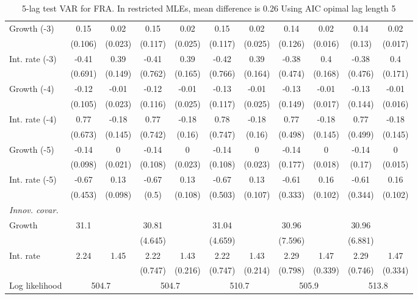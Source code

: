 \begin{table}[htbp]
\begin{tabular}{@{\extracolsep{4pt}}lcccccccccc@{}}
\quad Growth (-3) 	 &0.15 	 & 0.02 	 & 0.15 	 & 0.02 	 & 0.15 	 & 0.02 	 & 0.14 	 & 0.02 	 & 0.14 	 & 0.02	 \\ 
 		 & (0.106) 	 & (0.023) 	 & (0.117) 	 & (0.025) 	 & (0.117) 	 & (0.025) 	 & (0.126) 	 & (0.016) 	 & (0.13) 	 & (0.017) 	 \\ 
\quad Int. rate (-3) 	 &-0.41 	 & 0.39 	 & -0.41 	 & 0.39 	 & -0.42 	 & 0.39 	 & -0.38 	 & 0.4 	 & -0.38 	 & 0.4	 \\ 
 		 & (0.691) 	 & (0.149) 	 & (0.762) 	 & (0.165) 	 & (0.766) 	 & (0.164) 	 & (0.474) 	 & (0.168) 	 & (0.476) 	 & (0.171) 	 \\ 
\quad Growth (-4) 	 &-0.12 	 & -0.01 	 & -0.12 	 & -0.01 	 & -0.13 	 & -0.01 	 & -0.13 	 & -0.01 	 & -0.13 	 & -0.01	 \\ 
 		 & (0.105) 	 & (0.023) 	 & (0.116) 	 & (0.025) 	 & (0.117) 	 & (0.025) 	 & (0.149) 	 & (0.017) 	 & (0.144) 	 & (0.016) 	 \\ 
\quad Int. rate (-4) 	 &0.77 	 & -0.18 	 & 0.77 	 & -0.18 	 & 0.78 	 & -0.18 	 & 0.77 	 & -0.18 	 & 0.77 	 & -0.18	 \\ 
 		 & (0.673) 	 & (0.145) 	 & (0.742) 	 & (0.16) 	 & (0.747) 	 & (0.16) 	 & (0.498) 	 & (0.145) 	 & (0.499) 	 & (0.145) 	 \\ 
\quad Growth (-5) 	 &-0.14 	 & 0 	 & -0.14 	 & 0 	 & -0.14 	 & 0 	 & -0.14 	 & 0 	 & -0.14 	 & 0	 \\ 
 		 & (0.098) 	 & (0.021) 	 & (0.108) 	 & (0.023) 	 & (0.108) 	 & (0.023) 	 & (0.177) 	 & (0.018) 	 & (0.17) 	 & (0.015) 	 \\ 
\quad Int. rate (-5) 	 &-0.67 	 & 0.13 	 & -0.67 	 & 0.13 	 & -0.67 	 & 0.13 	 & -0.61 	 & 0.16 	 & -0.61 	 & 0.16	 \\ 
 		 & (0.453) 	 & (0.098) 	 & (0.5) 	 & (0.108) 	 & (0.503) 	 & (0.107) 	 & (0.333) 	 & (0.102) 	 & (0.344) 	 & (0.102) 	 \\ 
\rule{0pt}{4ex} \emph{Innov. covar.}  	 & 	 & 	 & 	 & 	 & 	 & 	 & 	 & 	 & 	 &\\ 
\quad Growth 	 &31.1 	 &  	 & 30.81 	 &  	 & 31.04 	 &  	 & 30.96 	 &  	 & 30.96 	 & 	 \\ 
 		 &  	 &  	 & (4.645) 	 &  	 & (4.659) 	 &  	 & (7.596) 	 &  	 & (6.881) 	 &  	 \\ 
\quad Int. rate 	 &2.24 	 & 1.45 	 & 2.22 	 & 1.43 	 & 2.22 	 & 1.43 	 & 2.29 	 & 1.47 	 & 2.29 	 & 1.47	 \\ 
 		 &  	 &  	 & (0.747) 	 & (0.216) 	 & (0.747) 	 & (0.214) 	 & (0.798) 	 & (0.339) 	 & (0.746) 	 & (0.334) 	 \\ 
 \hline \rule{0pt}{4ex} 
  Log likelihood 	 &\multicolumn{2}{c}{504.7} 	 & \multicolumn{2}{c}{504.7} 	 & \multicolumn{2}{c}{510.7} 	 & \multicolumn{2}{c}{505.9} 	 & \multicolumn{2}{c}{513.8}\\ 

 \hline 	\end{tabular}		\caption{5-lag test VAR for FRA. In restricted MLEs, mean difference is 0.26 Using AIC opimal lag length 5}
		\label{tab:FRAopt_}

\end{table}